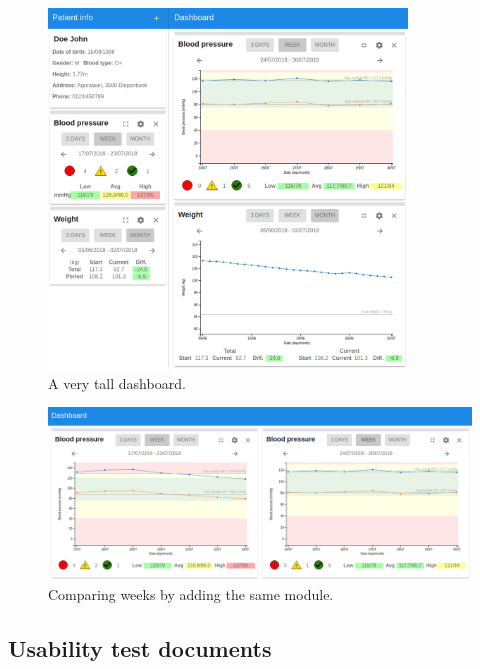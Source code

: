     \begin{figure}[!htb]
        \centering
        \includegraphics[width=0.85\textwidth]{screenshots/db_extra_1}
        \caption{A very tall dashboard.}\label{fig:screen_db_extra_1}
    \end{figure}

    \begin{figure}[!htb]
        \centering
        \includegraphics[width=1\textwidth]{screenshots/db_extra_2}
        \caption{Comparing weeks by adding the same module.}\label{fig:screen_db_extra_2}
    \end{figure}
\clearpage
\subsection{Usability test documents}